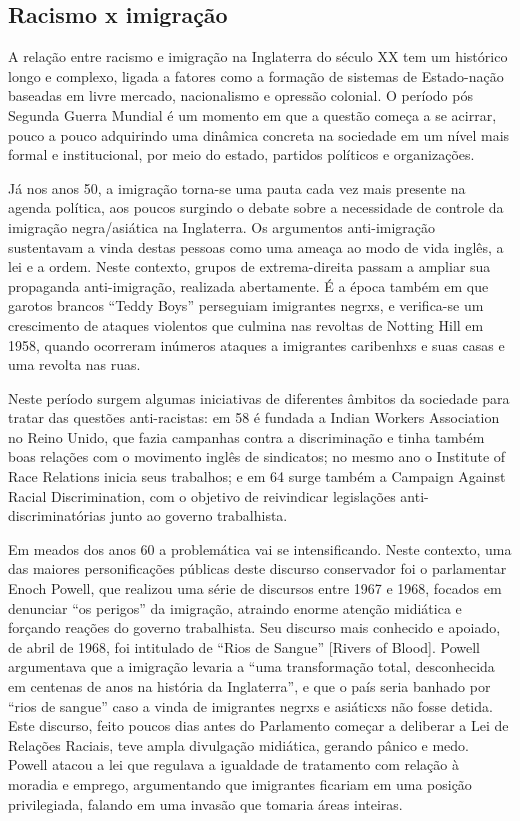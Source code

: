\subsection{Racismo x imigração}

A relação entre racismo e imigração na Inglaterra do século XX tem um histórico longo e complexo, ligada a fatores como a formação de sistemas de Estado-nação baseadas em livre mercado, nacionalismo e opressão colonial. O período pós Segunda Guerra Mundial é um momento em que a questão começa a se acirrar, pouco a pouco adquirindo uma dinâmica concreta na sociedade em um nível mais formal e institucional, por meio do estado, partidos políticos e organizações.

Já nos anos 50, a imigração torna-se uma pauta cada vez mais presente na agenda política, aos poucos surgindo o debate sobre a necessidade de controle da imigração negra/asiática na Inglaterra. Os argumentos anti-imigração sustentavam a vinda destas pessoas como uma ameaça ao modo de vida inglês, a lei e a ordem. Neste contexto, grupos de extrema-direita passam a ampliar sua propaganda anti-imigração, realizada abertamente. É a época também em que garotos brancos “Teddy Boys” perseguiam imigrantes negrxs, e verifica-se um crescimento de ataques violentos que culmina nas revoltas de Notting Hill em 1958, quando ocorreram inúmeros ataques a imigrantes caribenhxs e suas casas e uma revolta nas ruas.

Neste período surgem algumas iniciativas de diferentes âmbitos da sociedade para tratar das questões anti-racistas: em 58 é fundada a Indian Workers Association no Reino Unido, que fazia campanhas contra a discriminação e tinha também boas relações com o movimento inglês de sindicatos; no mesmo ano o Institute of Race Relations inicia seus trabalhos; e em 64 surge também a Campaign Against Racial Discrimination, com o objetivo de reivindicar legislações anti-discriminatórias junto ao governo trabalhista.

Em meados dos anos 60 a problemática vai se intensificando. Neste contexto, uma das maiores personificações públicas deste discurso conservador foi o parlamentar Enoch Powell, que realizou uma série de discursos entre 1967 e 1968, focados em denunciar “os perigos” da imigração, atraindo enorme atenção midiática e forçando reações do governo trabalhista. Seu discurso mais conhecido e apoiado, de abril de 1968, foi intitulado de “Rios de Sangue” [Rivers of Blood]. Powell argumentava que a imigração levaria a “uma transformação total, desconhecida em centenas de anos na história da Inglaterra”, e que o país seria banhado por “rios de sangue” caso a vinda de imigrantes negrxs e asiáticxs não fosse detida. Este discurso, feito poucos dias antes do Parlamento começar a deliberar a Lei de Relações Raciais, teve ampla divulgação midiática, gerando pânico e medo. Powell atacou a lei que regulava a igualdade de tratamento com relação à moradia e emprego, argumentando que imigrantes ficariam em uma posição privilegiada, falando em uma invasão que tomaria áreas inteiras.

